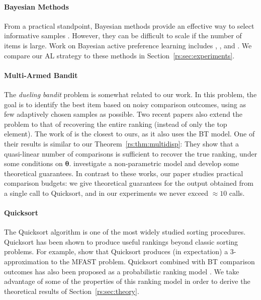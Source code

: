 \paragraph{Bayesian Methods}
From a practical standpoint, Bayesian methods provide an effective way to select informative samples \citep{mackay1992bayesian}.
However, they can be difficult to scale if the number of items is large.
Work on Bayesian active preference learning includes
\citet{chu2005extensions}, \citet{houlsby2012collaborative}, \citet{salimans2012collaborative} and \citet{chen2013pairwise}.
We compare our AL strategy to these methods in Section~\ref{rs:sec:experiments}.

\paragraph{Multi-Armed Bandit}
The \emph{dueling bandit} problem \citep{yue2009karmed} is somewhat related to our work.
In this problem, the goal is to identify the best item based on noisy comparison outcomes, using as few adaptively chosen samples as possible.
Two recent papers also extend the problem to that of recovering the entire ranking (instead of only the top element).
The work of \citet{szorenyi2015online} is the closest to ours, as it also uses the BT model.
One of their results is similar to our Theorem~\ref{rs:thm:multidisp}: They show that a quasi-linear number of comparisons is sufficient to recover the true ranking, under some conditions on $\bm{\theta}$.
\citet{heckel2016active} investigate a non-parametric model and develop some theoretical guarantees.
In contrast to these works, our paper studies practical comparison budgets: we give theoretical guarantees for the output obtained from a single call to Quicksort, and in our experiments we never exceed $\approx 10$ calls.

\paragraph{Quicksort}
The Quicksort algorithm \citep{hoare1962quicksort} is one of the most widely studied sorting procedures.
Quicksort has been shown to produce useful rankings beyond classic sorting problems.
For example, \citet{ailon2008aggregating} show that Quicksort produces (in expectation) a $3$-approximation to the MFAST problem.
Quicksort combined with BT comparison outcomes has also been proposed as a probabilistic ranking model \citep{ailon2008reconciling}.
We take advantage of some of the properties of this ranking model in order to derive the theoretical results of Section~\ref{rs:sec:theory}.
